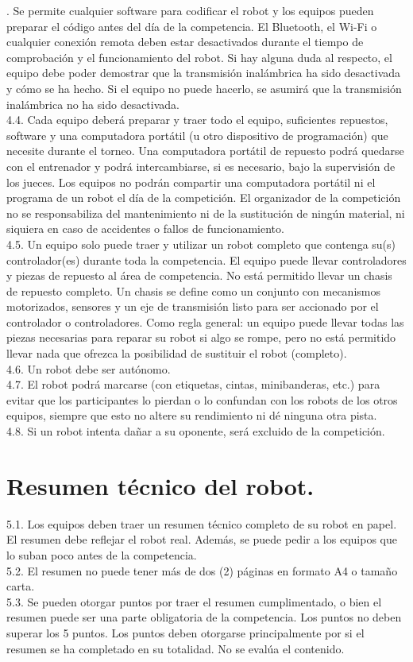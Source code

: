\documentclass[12pt,a4paper]{article}
\begin{document}
. Se permite cualquier software para codificar el robot y los equipos pueden preparar el código antes del día de la competencia. El Bluetooth, el Wi-Fi o cualquier conexión remota deben estar desactivados durante el tiempo de comprobación y el funcionamiento del robot. Si hay alguna duda al respecto, el equipo debe poder demostrar que la transmisión inalámbrica ha sido desactivada y cómo se ha hecho. Si el equipo no puede hacerlo, se asumirá que la transmisión inalámbrica no ha sido desactivada. \\
4.4. Cada equipo deberá preparar y traer todo el equipo, suficientes repuestos, software y una computadora portátil (u otro dispositivo de programación) que necesite durante el torneo. Una computadora portátil de repuesto podrá quedarse con el entrenador y podrá intercambiarse, si es necesario, bajo la supervisión de los jueces. Los equipos no podrán compartir una computadora portátil ni el programa de un robot el día de la competición. El organizador de la competición no se responsabiliza del mantenimiento ni de la sustitución de ningún material, ni siquiera en caso de accidentes o fallos de funcionamiento. \\
4.5. Un equipo solo puede traer y utilizar un robot completo que contenga su(s) controlador(es) durante toda la competencia. El equipo puede llevar controladores y piezas de repuesto al área de competencia. No está permitido llevar un chasis de repuesto completo. Un chasis se define como un conjunto con mecanismos motorizados, sensores y un eje de transmisión listo para ser accionado por el controlador o controladores. Como regla general: un equipo puede llevar todas las piezas necesarias para reparar su robot si algo se rompe, pero no está permitido llevar nada que ofrezca la posibilidad de sustituir el robot (completo). \\
4.6. Un robot debe ser autónomo. \\
4.7. El robot podrá marcarse (con etiquetas, cintas, minibanderas, etc.) para evitar que los participantes lo pierdan o lo confundan con los robots de los otros equipos, siempre que esto no altere su rendimiento ni dé ninguna otra pista. \\
4.8. Si un robot intenta dañar a su oponente, será excluido de la competición.

\section{Resumen técnico del robot.}
5.1. Los equipos deben traer un resumen técnico completo de su robot en papel. El resumen debe reflejar el robot real. Además, se puede pedir a los equipos que lo suban poco antes de la competencia. \\
5.2. El resumen no puede tener más de dos (2) páginas en formato A4 o tamaño carta. \\
5.3. Se pueden otorgar puntos por traer el resumen cumplimentado, o bien el resumen puede ser una parte obligatoria de la competencia. Los puntos no deben superar los 5 puntos. Los puntos deben otorgarse principalmente por si el resumen se ha completado en su totalidad. No se evalúa el contenido.
\end{document}
